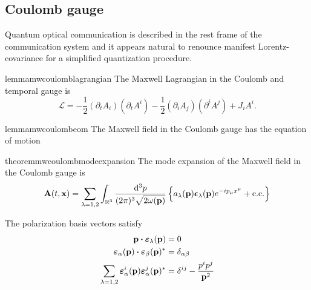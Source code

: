 \subsection{Coulomb gauge}

Quantum optical communication is described in the rest frame of the communication system and it appears natural to renounce manifest Lorentz-covariance for a simplified quantization procedure.
\begin{restatable}{lemma}{mwcoulomblagrangian}\label{thm:mw_coulomb_lagrangian}
	The Maxwell Lagrangian in the Coulomb and temporal gauge is
	\begin{equation}
		\mathcal{L}
		=
		-
		\frac{1}{2}
		\left(\partial_t A_i\right)
		\left(\partial_t A^i\right)
		-
		\frac{1}{2}
		\left(\partial_i A_j\right)
		\left(\partial^i A^j\right)
		+
		J_i A^i
		\label{eq:mw_coulomb_lagrangian}
		.
	\end{equation}
\end{restatable}
\begin{restatable}{lemma}{mwcoulombeom}\label{thm:mw_coulomb_eom}
	The Maxwell field in the Coulomb gauge has the equation of motion
	\begin{equation}
		
	\end{equation}
\end{restatable}
\begin{restatable}{theorem}{mwcoulombmodeexpansion}\label{thm:mw_coulomb_mode_expansion}
	The mode expansion of the Maxwell field in the Coulomb gauge is
	\begin{equation}
		\vb{A}(t,\vb{x})
		=
		\sum_{\lambda=1,2}
		\int_{\mathbb{R}^3}\frac{\dd[3]{p}}{(2\pi)^3\sqrt{2\omega(\vb{p})}}
		\left\{
			a_\lambda(\vb{p})
			\boldsymbol{\epsilon}_\lambda(\vb{p})
			e^{-ip_\mu x^\mu}
			+
			\text{c.c.}
		\right\}
		\label{eq:mw_ft}
	\end{equation}
\end{restatable}
\begin{theorem}
	The polarization basis vectors satisfy~\cite[p.~341]{Srednicki2007}
	\begin{align}
		\vb{p}
		\vdot
		\boldsymbol{\varepsilon}_\lambda(\vb{p})
		&=
		0
		\\
		\boldsymbol{\varepsilon}_\alpha(\vb{p})
		\vdot
		\boldsymbol{\varepsilon}_\beta(\vb{p})^*
		&=
		\delta_{\alpha\beta}
		\\
		\sum_{\lambda=1,2}
		\boldsymbol{\varepsilon}_\alpha^i(\vb{p})
		\boldsymbol{\varepsilon}_\alpha^j(\vb{p})^*
		&=
		\delta^{ij}
		-
		\frac{p^ip^j}{\vb{p}^2}
	\end{align}
\end{theorem}
